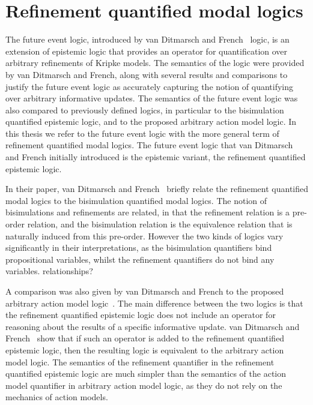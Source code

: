 \section{Refinement quantified modal logics}

The future event logic, introduced by van Ditmarsch and
French~\cite{french2009simulation} logic, is an extension of epistemic logic
that provides an operator for quantification over arbitrary refinements of
Kripke models. The semantics of the logic were provided by van Ditmarsch and
French, along with several results and comparisons to justify the future event
logic as accurately capturing the notion of quantifying over arbitrary
informative updates. The semantics of the future event logic was also compared
to previously defined logics, in particular to the bisimulation quantified
epistemic logic, and to the proposed arbitrary action model logic.  In this
thesis we refer to the future event logic with the more general term of
refinement quantified modal logics. The future event logic that van Ditmarsch
and French initially introduced is the epistemic variant, the refinement
quantified epistemic logic.

In their paper, van Ditmarsch and French~\cite{french2009simulation} briefly
relate the refinement quantified modal logics to the bisimulation quantified
modal logics.  The notion of bisimulations and refinements are related, in that
the refinement relation is a pre-order relation, and the bisimulation relation
is the equivalence relation that is naturally induced from this pre-order.
However the two kinds of logics vary significantly in their interpretations, as
the bisimulation quantifiers bind propositional variables, whilst the
refinement quantifiers do not bind any variables. %
relationships?

A comparison was also given by van Ditmarsch and French to the proposed
arbitrary action model logic~\cite{french2009simulation}. The main difference
between the two logics is that the refinement quantified epistemic logic does
not include an operator for reasoning about the results of a specific
informative update. van Ditmarsch and French~\cite{french2009simulation} show
that if such an operator is added to the refinement quantified epistemic logic,
then the resulting logic is equivalent to the arbitrary action model logic. The
semantics of the refinement quantifier in the refinement quantified epistemic
logic are much simpler than the semantics of the action model quantifier in
arbitrary action model logic, as they do not rely on the mechanics of action
models.

